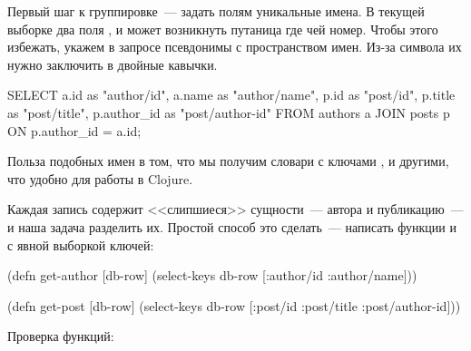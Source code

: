 
Первый шаг к группировке~--- задать полям уникальные имена. В текущей выборке два поля , и может возникнуть путаница где чей номер. Чтобы этого избежать, укажем в запросе псевдонимы с пространством имен. Из-за символа \code{/} их нужно заключить в двойные кавычки.

\begin{english}
  \begin{sql}
SELECT
  a.id        as "author/id",
  a.name      as "author/name",
  p.id        as "post/id",
  p.title     as "post/title",
  p.author_id as "post/author-id"
FROM authors a
JOIN posts p ON p.author_id = a.id;
  \end{sql}
\end{english}

Польза подобных имен в том, что мы получим словари с ключами ,  и другими, что удобно для работы в Clojure.

Каждая запись содержит <<слипшиеся>> сущности~--- автора и публикацию~--- и наша задача разделить их. Простой способ это сделать~--- написать функции  и  с явной выборкой ключей:

\begin{english}
  \begin{clojure}
(defn get-author [db-row]
  (select-keys db-row [:author/id :author/name]))

(defn get-post [db-row]
  (select-keys db-row
    [:post/id :post/title :post/author-id]))
  \end{clojure}
\end{english}

Проверка функций:

